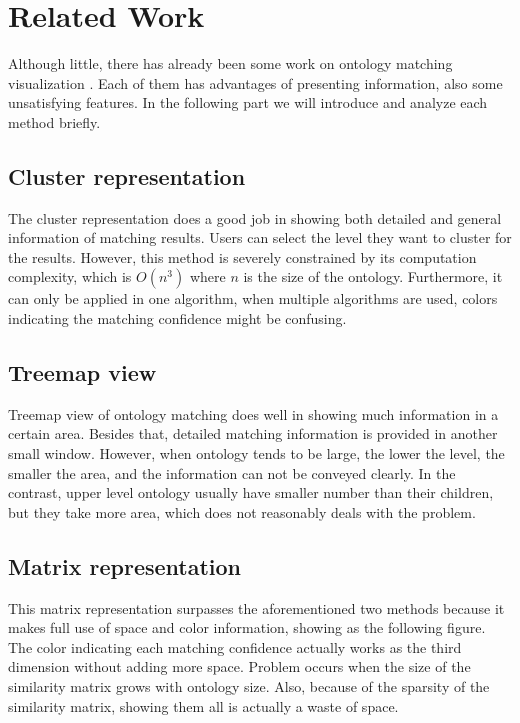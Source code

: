 \chapter{Related Work}
Although little, there has already been some work on ontology matching visualization \cite{falconer2007cognitive}. Each of them has advantages of presenting information, also some unsatisfying features. In the following part we will introduce and analyze each method briefly.

\section{Cluster representation} %
\label{sub:cluster_representation}
    The cluster representation \cite{Lanzenberger06alviz-} does a good job in showing both detailed and general information of matching results. Users can select the level they want to cluster for the results. However, this method is severely constrained by its computation complexity, which is $O(n^3)$ where $n$ is the size of the ontology. Furthermore, it can only be applied in one algorithm, when multiple algorithms are used, colors indicating the matching confidence might be confusing.

\section{Treemap view} %
\label{sub:treemap_view}
    Treemap view \cite{falconer2007cognitive} of ontology matching does well in showing much information in a certain area. Besides that, detailed matching information is provided in another small window. However, when ontology tends to be large, the lower the level, the smaller the area, and the information can not be conveyed clearly. In the contrast, upper level ontology usually have smaller number than their children, but they take more area, which does not reasonably deals with the problem.
\section{Matrix representation} %
\label{sub:matrix_representation}
    This matrix representation \cite{cruz2012interactive} surpasses the aforementioned two methods because it makes full use of space and color information, showing as the following figure. The color indicating each matching confidence actually works as the third dimension without adding more space. Problem occurs when the size of the similarity matrix grows with ontology size. Also, because of the sparsity of the similarity matrix, showing them all is actually a waste of space. 


